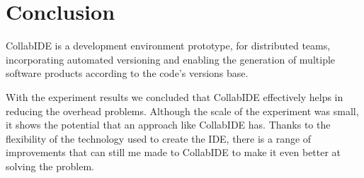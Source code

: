 
\section{Conclusion}
\label{sec:conclusion}

CollabIDE is a development environment prototype, for distributed teams, incorporating automated versioning and enabling the generation of multiple software products according to the code's versions base.

With the experiment results we concluded that CollabIDE effectively helps in reducing the overhead 
problems. Although the scale of the experiment was small, it shows the potential that an approach like 
CollabIDE has. Thanks to the flexibility of the technology used to create the IDE, there is a range of 
improvements that can still me made to CollabIDE to make it even better at solving the problem.  



\endinput